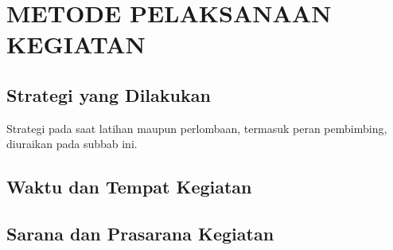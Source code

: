 \chapter{METODE PELAKSANAAN KEGIATAN}
\section{Strategi yang Dilakukan}
Strategi pada saat latihan maupun perlombaan, termasuk peran pembimbing, diuraikan pada subbab ini.

\section{Waktu dan Tempat Kegiatan}
\section{Sarana dan Prasarana Kegiatan}
